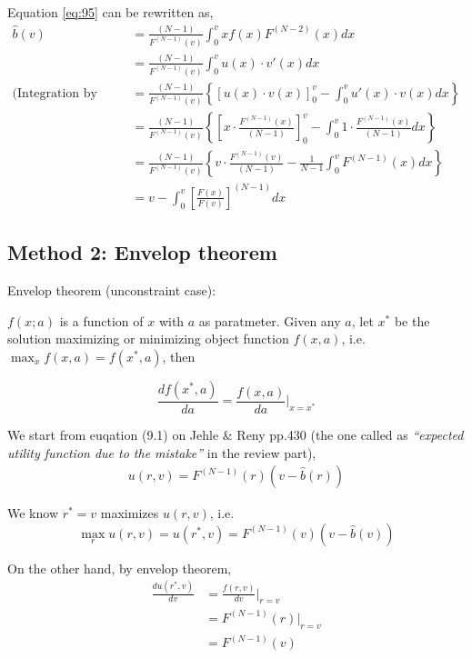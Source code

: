 \documentclass{article}
\begin{document}
Equation \ref{eq:95} can be rewritten as,
\begin{align*}
\hat{b}(v)&= \frac{(N-1)}{F^{(N-1)}(v)} \int_0^{v}xf(x)F^{(N-2)}(x)dx \\
&= \frac{(N-1)}{F^{(N-1)}(v)} \int_0^{v} u(x)\cdot v'(x)dx \\
\text{(Integration by parts:)}\quad &=\frac{(N-1)}{F^{(N-1)}(v)} \left\{\left[u(x) \cdot v(x)\right]_0^v - \int_0^v u'(x) \cdot v(x) dx\right\} \\
&=\frac{(N-1)}{F^{(N-1)}(v)}  \left\{\left[x \cdot \frac{F^{(N-1)}(x)}{(N-1)}\right]_0^v - \int_0^v 1 \cdot \frac{F^{(N-1)}(x)}{(N-1)} dx \right\} \\
&=\frac{(N-1)}{F^{(N-1)}(v)}  \left\{v \cdot \frac{F^{(N-1)}(v)}{(N-1)} -   \frac{1}{N-1} \int_0^v F^{(N-1)}(x) dx \right\} \\
&= v -  \int_0^v \left[\frac{F(x)}{F(v)}\right]^{(N-1)} dx 
\end{align*}

\subsection*{Method 2: Envelop theorem}


\begin{mdframed}[backgroundcolor=blue!20,linecolor=white]
Envelop theorem (unconstraint case):

\medskip

$f(x;a)$ is a function of $x$ with $a$ as paratmeter. Given any $a$, let $x^*$ be the solution maximizing or minimizing object function $f(x,a)$, i.e. $\max_{x} f(x,a)= f(x^*,a)$, then

$$\frac{d f(x^*,a)}{d a} = \frac{f(x,a)}{d a} \bigg\rvert_{x=x^*} $$
\end{mdframed}

We start from euqation (9.1) on Jehle \& Reny pp.430 (the one called as \textit{``expected utility function due to the mistake''} in the review part),
\begin{align*}
u(r,v)= F^{(N-1)}(r) (v-\hat{b}(r))
\end{align*}

We know $r^*=v$ maximizes $u(r,v)$, i.e. 
\begin{equation}
\max_r u(r,v) = u(r^*,v)=F^{(N-1)}(v) (v-\hat{b}(v))
    \label{eq:max1}   
\end{equation}

On the other hand, by envelop theorem,
\begin{align*}
\frac{d u(r^*,v)}{d v} &= \frac{f(r,v)}{d v} \bigg\rvert_{r=v} \\
&= F^{(N-1)}(r) \bigg\rvert_{r=v} \\
&=F^{(N-1)}(v)
\end{align*}
\end{document}
